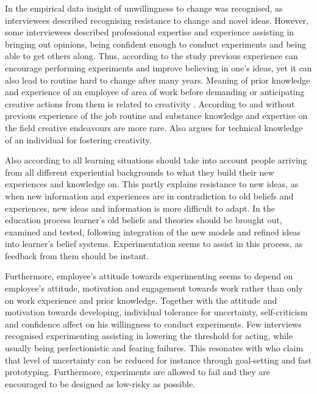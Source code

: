 In the empirical data insight of unwillingness to change was recognised, as interviewees described recognising resistance to change and novel ideas. However, some interviewees described professional expertise and experience assisting in bringing out opinions, being confident enough to conduct experiments and being able to get others along. Thus, according to the study previous experience can encourage performing experiments and improve believing in one's ideas, yet it can also lead to routine hard to change after many years. Meaning of prior knowledge and experience of an employee of area of work before demanding or anticipating creative actions from them is related to creativity \citep{mumford1988creativity,redmond1993putting,shalley2004leaders}. According to \citet{mumford1988creativity} and \citet{redmond1993putting} without previous experience of the job routine and substance knowledge and expertise on the field creative endeavours are more rare. Also \citet{jung2003role} argues for technical knowledge of an individual for fostering creativity.

Also according to \citet{kolb1984experiential} all learning situations should take into account people arriving from all different experiential backgrounds to what they build their new experiences and knowledge on. This partly explains resistance to new ideas, as when new information and experiences are in contradiction to old beliefs and experiences, new ideas and information is more difficult to adapt. In the education process learner's old beliefs and theories should be brought out, examined and tested, following integration of the new models and refined ideas into learner's belief systems. Experimentation seems to assist in this process, as feedback from them should be instant. 

Furthermore, employee's attitude towards experimenting seems to depend on employee's attitude, motivation and engagement towards work rather than only on work experience and prior knowledge. Together with the attitude and motivation towards developing, individual tolerance for uncertainty, self-criticism and confidence affect on his willingness to conduct experiments. Few interviews recognised experimenting assisting in lowering the threshold for acting, while usually being perfectionistic and fearing failures. This resonates with \citet{mumford2002leading} who claim that level of uncertainty can be reduced for instance through goal-setting and fast prototyping. Furthermore, experiments are allowed to fail and they are encouraged to be designed as low-risky as possible. 

